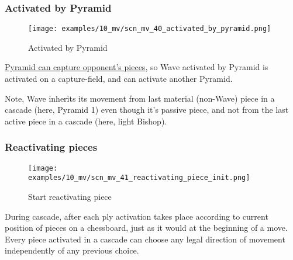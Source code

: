 \subsubsection*{Activated by Pyramid}
\label{sec:Miranda's veil/Wave/Cascading Waves/Activated by Pyramid}

\vspace*{-1.4\baselineskip}
\noindent
\begin{figure}[!h]
\texttt{[image: examples/10\_mv/scn\_mv\_40\_activated\_by\_pyramid.png]}
\vspace*{-1.3\baselineskip}
\caption{Activated by Pyramid}
\label{fig:scn_mv_40_activated_by_pyramid}
\end{figure}

\vspace*{-0.3\baselineskip}
\hyperref[fig:scn_ma_02_pyramid_activated]{Pyramid can capture opponent's pieces},
so Wave activated by Pyramid is activated on a capture-field, and can activate
another Pyramid.

Note, Wave inherits its movement from last material (non-Wave) piece in a cascade
(here, Pyramid 1) even though it's passive piece, and not from the last active
piece in a cascade (here, light Bishop).

\clearpage %

\subsubsection*{Reactivating pieces}
\label{sec:Miranda's veil/Wave/Cascading Waves/Reactivating pieces}

\vspace*{-1.4\baselineskip}
\noindent
\begin{figure}[!h]
\texttt{[image: examples/10\_mv/scn\_mv\_41\_reactivating\_piece\_init.png]}
\caption{Start reactivating piece}
\label{fig:scn_mv_41_reactivating_piece_init}
\end{figure}

During cascade, after each ply activation takes place according to current position
of pieces on a chessboard, just as it would at the beginning of a move. Every piece
activated in a cascade can choose any legal direction of movement independently of
any previous choice.

